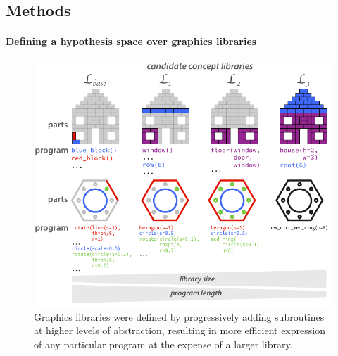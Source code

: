 

\subsection{Methods}
\paragraph{Defining a hypothesis space over graphics libraries} 

\begin{figure}[t]
  \begin{center}
  \includegraphics[width=0.99\linewidth]{figures/lax_libraries_gradient.pdf} %
  \caption{Graphics libraries were defined by progressively adding subroutines at higher levels of abstraction, resulting in more efficient expression of any particular program at the expense of a larger library.}
  \label{fig:library_gallery}
  \end{center}
\end{figure}

